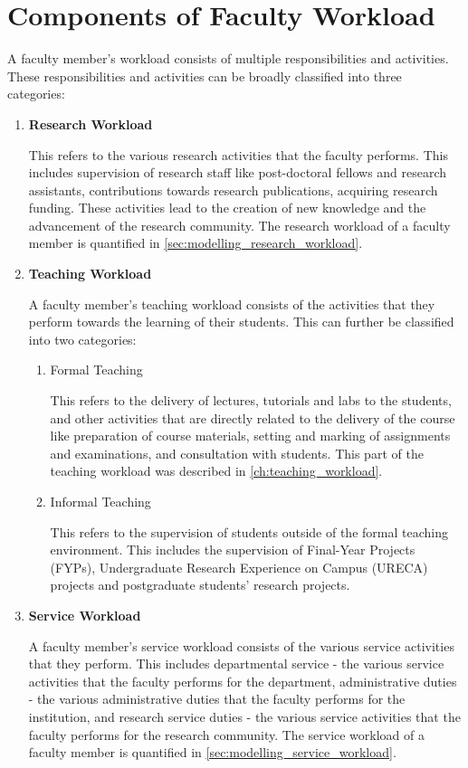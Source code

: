 \section{Components of Faculty Workload}

A faculty member's workload consists of multiple responsibilities and activities. These responsibilities and activities can be broadly classified into three categories:

\begin{enumerate}
  \item \textbf{Research Workload}

        This refers to the various research activities that the faculty performs. This includes supervision of research staff like post-doctoral fellows and research assistants, contributions towards research publications, acquiring research funding. These activities lead to the creation of new knowledge and the advancement of the research community. The research workload of a faculty member is quantified in \autoref{sec:modelling_research_workload}.

  \item \textbf{Teaching Workload}

        A faculty member's teaching workload consists of the activities that they perform towards the learning of their students. This can further be classified into two categories:

        \begin{enumerate}
          \item Formal Teaching

                This refers to the delivery of lectures, tutorials and labs to the students, and other activities that are directly related to the delivery of the course like preparation of course materials, setting and marking of assignments and examinations, and consultation with students. This part of the teaching workload was described in \autoref{ch:teaching_workload}.

          \item Informal Teaching

                This refers to the supervision of students outside of the formal teaching environment. This includes the supervision of Final-Year Projects (FYPs), Undergraduate Research Experience on Campus (URECA) projects and postgraduate students' research projects.

        \end{enumerate}

  \item \textbf{Service Workload}

        A faculty member's service workload consists of the various service activities that they perform. This includes departmental service - the various service activities that the faculty performs for the department, administrative duties - the various administrative duties that the faculty performs for the institution, and research service duties - the various service activities that the faculty performs for the research community. The service workload of a faculty member is quantified in \autoref{sec:modelling_service_workload}.

\end{enumerate}

